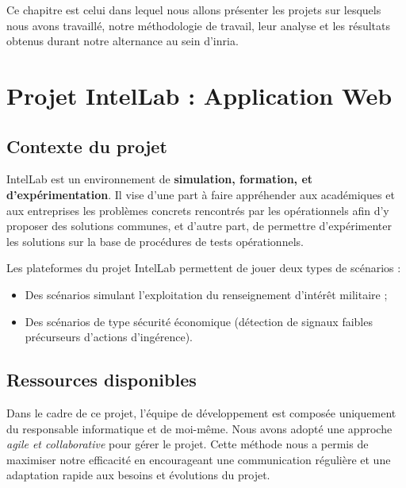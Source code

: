 \sloppy


Ce chapitre est celui dans lequel nous allons présenter les projets sur lesquels nous avons travaillé, notre méthodologie de travail, leur analyse et les résultats obtenus durant notre alternance au sein d'inria.

\section{Projet IntelLab : Application Web}

\subsection{Contexte du projet}

IntelLab est un environnement de \textbf{simulation, formation, et d’expérimentation}. Il vise d’une part à faire appréhender aux académiques et aux entreprises les problèmes concrets rencontrés par les opérationnels afin d’y proposer des solutions communes, et d’autre part, de permettre d’expérimenter les solutions sur la base de procédures de tests opérationnels.

\noindent Les plateformes du projet IntelLab permettent de jouer deux types de scénarios :

\begin{itemize}\addtolength{\itemsep}{-0.35\baselineskip}%
	\item Des scénarios simulant l'exploitation du renseignement d'intérêt militaire ;
	\item Des scénarios de type sécurité économique (détection de signaux faibles précurseurs d'actions d'ingérence).
\end{itemize}

\subsection{Ressources disponibles}
Dans le cadre de ce projet, l'équipe de développement est composée uniquement du responsable informatique et de moi-même. Nous avons adopté une approche \textit{agile et collaborative} pour gérer le projet.
Cette méthode nous a permis de maximiser notre efficacité en encourageant une communication régulière et une adaptation rapide aux besoins et évolutions du projet.


